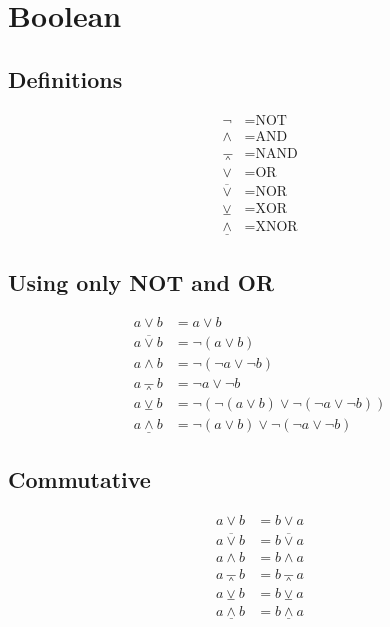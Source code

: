 \documentclass{report}
\DeclareRobustCommand{\lnor}{
    \mathbin{\overline{\vee}}
}
\DeclareRobustCommand{\lxnor}{
    \mathbin{\underline{\wedge}}
}
\def\lnand{\barwedge}
\def\lxor{\veebar}
\theoremstyle{mytheoremstyle}
\theoremstyle{mytheoremstyle}
\theoremstyle{myproblemstyle}
\begin{document}
    \section{Boolean}
    \subsection{Definitions}
    \begin{align*}
        \lnot  &= \text{NOT}  \\
        \land  &= \text{AND}  \\
        \lnand &= \text{NAND} \\
        \lor   &= \text{OR}   \\
        \lnor  &= \text{NOR}  \\
        \lxor  &= \text{XOR}  \\
        \lxnor &= \text{XNOR}
    \end{align*}
    \subsection{Using only NOT and OR}
    \begin{align}
        a \lor b &= a \lor b \\
        a \lnor b &= \lnot(a \lor b) \\
        a \land b &= \lnot(\lnot a \lor \lnot b) \\
        a \lnand b &= \lnot a \lor \lnot b \\
        a \lxor b &= \lnot(\lnot (a \lor b) \lor \lnot(\lnot a \lor \lnot b)) \\
        a \lxnor b &= \lnot(a \lor b) \lor \lnot (\lnot a \lor \lnot b)
    \end{align}
    \subsection{Commutative}
    \begin{align}
        a \lor b &= b \lor a \\
        a \lnor b &= b \lnor a \\
        a \land b &= b \land a \\
        a \lnand b &= b \lnand a \\
        a \lxor b &= b \lxor a \\
        a \lxnor b &= b \lxnor a \\
    \end{align}
\end{document}
